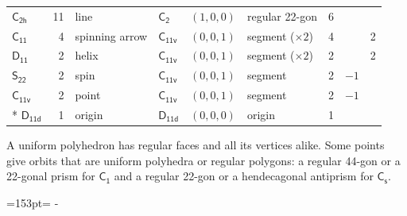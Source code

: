 \documentclass[10pt,a4paper]{article}
\newcommand{\needspace}[1]{\par\penalty-100\begingroup\dimen0=#1\relax\dimen2=\pagegoal
  \advance\dimen2-\pagetotal\ifdim\dimen0>\dimen2\relax\ifdim\dimen2>0pt\vfil\break\fi\fi
  \endgroup}
\numberwithin{equation}{section}
\newcommand{\grp}[1]{\mathsf{#1}}
\newlength{\fillwidth}\newlength{\cellwidth}\newlength{\colwidth}
\begin{document}
{{\begin{longtable}{@{}lrllllr>{\RaggedRight\arraybackslash}p{\fillwidth}r@{}}
\href{C2h.pdf}{$\grp{C_{2h}}$} & 11 & line & \href{C2.pdf}{$\grp{C_{2}}$} & $(1, 0, 0)$ & regular 22-gon & 6 &  & \\
\href{C11.pdf}{$\grp{C_{11}}$} & 4 & spinning arrow & \href{C11v.pdf}{$\grp{C_{11v}}$} & $(0, 0, 1)$ & segment (${\times}2$) & 4 &  & 2\\
\href{D11.pdf}{$\grp{D_{11}}$} & 2 & helix & \href{C11v.pdf}{$\grp{C_{11v}}$} & $(0, 0, 1)$ & segment (${\times}2$) & 2 &  & 2\\
\href{S22.pdf}{$\grp{S_{22}}$} & 2 & spin & \href{C11v.pdf}{$\grp{C_{11v}}$} & $(0, 0, 1)$ & segment & 2 & ${-1}$ & \\
\href{C11v.pdf}{$\grp{C_{11v}}$} & 2 & point & \href{C11v.pdf}{$\grp{C_{11v}}$} & $(0, 0, 1)$ & segment & 2 & ${-1}$ & \\*
\href{D11d.pdf}{$\grp{D_{11d}}$} & 1 & origin & \href{D11d.pdf}{$\grp{D_{11d}}$} & $(0, 0, 0)$ & origin & 1 &  & \\
\bottomrule\end{longtable}}}
A uniform polyhedron has regular faces and all its vertices alike. Some points give orbits that are uniform polyhedra or regular polygons: a regular 44-gon or a 22-gonal prism for \href{C1.pdf}{$\grp{C_{1}}$} and a regular 22-gon or a hendecagonal antiprism for \href{C1v.pdf}{$\grp{C_{s}}$}.
\needspace{153pt}
\end{document}
